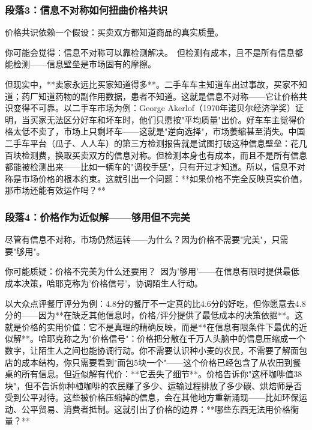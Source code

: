 \documentclass[a4paper,12pt]{book}
\begin{document}
	\subsubsection*{段落3：信息不对称如何扭曲价格共识}
	价格共识依赖一个假设：买卖双方都知道商品的真实质量。
	\begin{tcolorbox}[colback=yellow!5, title=\textit{读者行为预测}]
		你可能会觉得：信息不对称可以靠检测解决。\ 但检测有成本，且不是所有信息都能检测——信息壁垒是市场固有的摩擦。
	\end{tcolorbox}

但现实中，**卖家永远比买家知道得多**。二手车车主知道车出过事故，买家不知道；药厂知道药物的副作用数据，患者不知道。这就是信息不对称——它让价格共识变得不可靠。以二手车市场为例：George Akerlof（1970年诺贝尔经济学奖）证明，当买家无法区分好车和坏车时，他们只愿按"平均质量"出价。好车车主觉得价格太低不卖了，市场上只剩坏车——这就是"逆向选择"，市场萎缩甚至消失。中国二手车平台（瓜子、人人车）的第三方检测报告就是试图打破这种信息壁垒：花几百块检测费，换取买卖双方的信息对称。但检测本身也有成本，而且不是所有信息都能被检测出来——比如一辆车的"调校手感"，只有开过才知道。所以，信息不对称是市场价格的根本约束。这就引出一个问题：**如果价格不完全反映真实价值，那市场还能有效运作吗？**

	\subsubsection*{段落4：价格作为近似解——够用但不完美}
	尽管有信息不对称，市场仍然运转——为什么？因为价格不需要"完美"，只需要"够用"。
	\begin{tcolorbox}[colback=yellow!5, title=\textit{读者行为预测}]
		你可能质疑：价格不完美为什么还要用？\ 因为'够用'——在信息有限时提供最低成本决策，哈耶克称为'价格信号'，协调陌生人行动。
	\end{tcolorbox}

以大众点评餐厅评分为例：4.8分的餐厅不一定真的比4.6分的好吃，但你愿意去4.8分的——因为**在缺乏其他信息时，价格/评分提供了最低成本的决策依据**。这就是价格的实用价值：它不是真理的精确反映，而是**在信息有限条件下最优的近似解**。哈耶克称之为"价格信号"：价格把分散在千万人头脑中的信息压缩成一个数字，让陌生人之间也能协调行动。你不需要认识种小麦的农民，不需要了解面包店的成本结构，你只需要看到"面包5块一个"——这个价格已经包含了从农田到餐桌的所有信息。但近似解有代价：**它丢失了细节**。价格告诉你"这杯咖啡值38块"，但不告诉你种植咖啡的农民赚了多少、运输过程排放了多少碳、烘焙师是否受到公平对待。这些被价格压缩掉的信息，会在其他地方重新涌现——比如环保运动、公平贸易、消费者抵制。这就引出了价格的边界：**哪些东西无法用价格衡量？**
\end{document}
